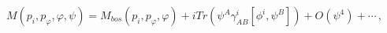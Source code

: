 \begin{equation}\label{4.1}
M(p_i,p_{\varphi},\varphi,\psi)=M_{bos}(p_i,p_{\varphi},\varphi)
+iTr(\psi^A\gamma^i_{AB}[\phi^i,\psi^B])+O(\psi^4)+\cdots \,,
\end{equation}

